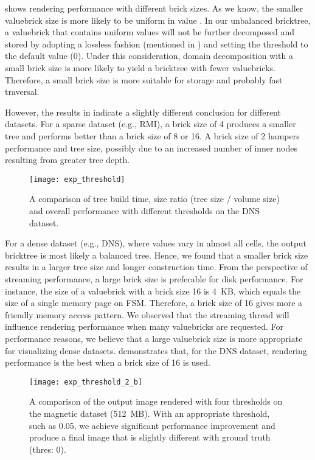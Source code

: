  shows rendering performance with different brick sizes.
As we know, the smaller valuebrick size is more likely to be uniform in value 
\cite{fogal2013analysis}. In our unbalanced bricktree, a valuebrick that contains
uniform values will not be further decomposed and stored by adopting a lossless 
fashion (mentioned in ) and setting the threshold 
to the default value (0). Under this consideration, domain decomposition with a 
small brick size is more likely to yield a bricktree with fewer valuebricks. 
Therefore, a small brick size is more suitable for storage and probably fast traversal. 

However, the results in  indicate a slightly
different conclusion for different datasets. For a sparse dataset (e.g., RMI),
a brick size of 4 produces a smaller tree and performs better than a brick size of 8 or 16. A brick size of 2 hampers performance and tree size, possibly due to an increased number of inner nodes resulting from greater tree depth. 

\begin{figure}[t]
    \centering
    \texttt{[image: exp\_threshold]}
    \vspace{-2em}
	\caption{\label{fig:exp_threshold}%
	A comparison of tree build time, size ratio (tree size / volume size) and overall performance with different thresholds on the DNS dataset.}
	\vspace{-0.5em}
\end{figure}


For a dense dataset (e.g., DNS), where values vary in almost all cells,
the output bricktree is most likely a balanced tree. Hence, we found that
a smaller brick size results in a larger tree size and longer construction time.
From the perspective of streaming performance, a large brick size is preferable 
for disk performance. For instance, the size of a valuebrick with a
brick size 16 is 4~KB, which equals the size of a single memory page on FSM. 
Therefore, a brick size of 16 gives more a friendly memory access pattern. 
We observed that the streaming thread will influence rendering performance
when many valuebricks are requested. For performance reasons, we believe that a 
large valuebrick size is more appropriate for visualizing dense datasets. 
 demonstrates that, for the DNS dataset, rendering
performance is the best when a brick size of 16 is used. 

\begin{figure*}[t]
    \centering
    \texttt{[image: exp\_threshold\_2\_b]}
	\caption{\label{fig:exp_threshold_2}%
	A comparison of the output image rendered with four thresholds on the magnetic dataset (512~MB).
	With an appropriate threshold, such as 0.05, we achieve significant performance improvement and produce a final image that is slightly different with ground truth (thres: 0).
	}
\end{figure*}

